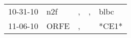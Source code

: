 \begin{supertabular}{lllll}
 10-31-10 &   n2f &  , &  , &   blbc \\
 11-06-10 &  ORFE &  , &    &  *CE1* \\
\end{supertabular}
